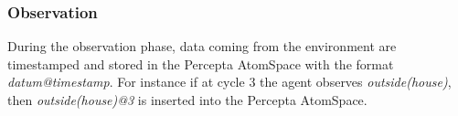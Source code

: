 \documentclass[runningheads]{llncs}
\begin{document}
\subsubsection{Observation}
During the observation phase, data coming from the environment are
timestamped and stored in the Percepta AtomSpace with the format
\textit{datum@timestamp}.  For instance if at cycle 3 the agent
observes \textit{outside(house)}, then \textit{outside(house)@3}
is inserted into the Percepta AtomSpace.
\end{document}

